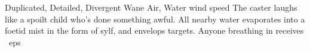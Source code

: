   {Duplicated, Detailed, Divergent}%
  {Wane}%
  {Air, Water}%
  {wind speed}%
  {
    The caster laughs like a spoilt child who's done something awful.
    All nearby water evaporates into a foetid mist in the form of \gls{sylf}, and envelops  targets.
    Anyone breathing in receives \showDam~\glspl{ep}}%
  {}
